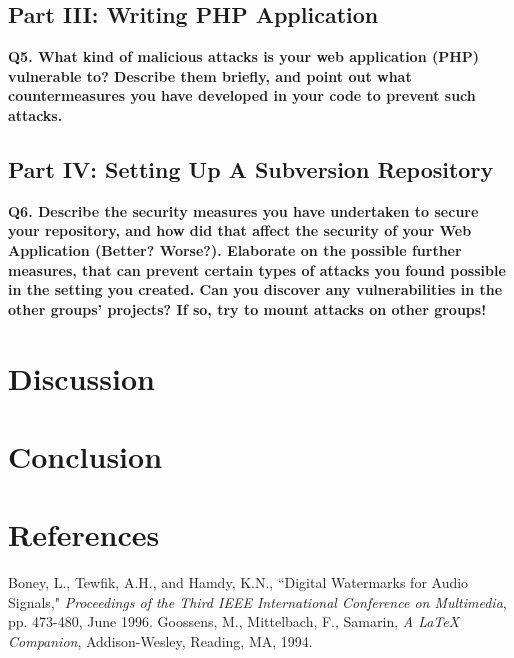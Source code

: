 \documentclass[a4paper, 12pt]{article}
\begin{document}
\subsection{Part III: Writing PHP Application}
{\bf Q5. What kind of malicious attacks is your web application (PHP) vulnerable to? Describe
them briefly, and point out what countermeasures you have developed in your code to prevent
such attacks.}

\subsection{Part IV: Setting Up A Subversion Repository}
{\bf Q6. Describe the security measures you have undertaken to secure your repository, and
how did that affect the security of your Web Application (Better? Worse?). Elaborate on the
possible further measures, that can prevent certain types of attacks you found possible in the
setting you created. Can you discover any vulnerabilities in the other groups’ projects? If so,
try to mount attacks on other groups!}

\section{Discussion}

\section{Conclusion}


\section{References}
\newpage
\renewcommand*{\bibname}{\vspace{-20pt}\section{References}\vspace{-20pt}}



\begin{thebibliography}{10}
 Boney, L., Tewfik, A.H., and Hamdy, K.N., ``Digital
Watermarks for Audio Signals," \emph{Proceedings of the Third IEEE
International Conference on Multimedia}, pp. 473-480, June 1996.
 Goossens, M., Mittelbach, F., Samarin, \emph{A LaTeX
Companion}, Addison-Wesley, Reading, MA, 1994.
\end{thebibliography}
\end{document}
